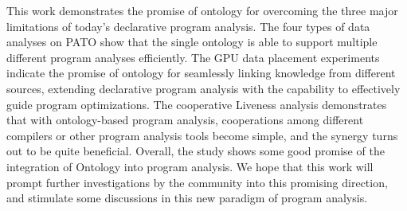 This work demonstrates the promise of ontology for overcoming the
three major limitations of today's declarative program analysis. The
four types of data analyses on PATO show that the single ontology is
able to support multiple different program analyses efficiently. The
GPU data placement experiments indicate the promise of ontology for
seamlessly linking knowledge from different sources, extending
declarative program analysis with the capability to effectively guide
program optimizations. The cooperative Liveness analysis demonstrates
that with ontology-based program analysis, cooperations among
different compilers or other program analysis tools become simple, and
the synergy turns out to be quite beneficial. Overall, the study shows
some good promise of the integration of Ontology into program
analysis. We hope that this work will prompt further investigations by
the community into this promising direction, and stimulate some
discussions in this new paradigm of program analysis.
